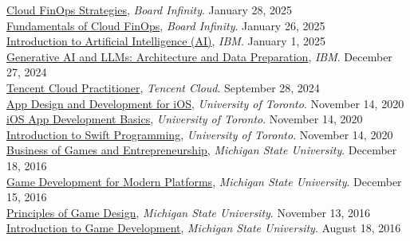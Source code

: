 \documentclass[10pt]{res} %
\begin{document}
\begin{resume}
\colorbox{coursera}{}

\href{https://www.coursera.org/account/accomplishments/verify/W17OMEODYOGQ}{\color{blue}Cloud FinOps Strategies}, {\sl Board Infinity}. \hfill January 28, 2025 \\
\href{https://www.coursera.org/account/accomplishments/verify/2QHS7KJOMACG}{\color{blue}Fundamentals of Cloud FinOps}, {\sl Board Infinity}. \hfill January 26, 2025 \\
\href{https://www.coursera.org/account/accomplishments/verify/6F3Z3FC1R420}{\color{blue}Introduction to Artificial Intelligence (AI)}, {\sl IBM}. \hfill January 1, 2025 \\
\href{https://www.credly.com/badges/c5eb5d9d-c931-4ab3-af52-73b564aa8a4d}{\color{blue}Generative AI and LLMs: Architecture and Data Preparation}, {\sl IBM}. \hfill December 27, 2024 \\
\href{https://www.coursera.org/account/accomplishments/verify/M3NIYKKEW8LX}{\color{blue}Tencent Cloud Practitioner}, {\sl Tencent Cloud}. \hfill September 28, 2024 \\
\href{https://www.coursera.org/account/accomplishments/verify/6SB343K34JGV}{\color{blue}App Design and Development for iOS}, {\sl University of Toronto}. \hfill November 14, 2020 \\
\href{https://www.coursera.org/account/accomplishments/verify/8UX6MFTRHJZH}{\color{blue}iOS App Development Basics}, {\sl University of Toronto}. \hfill November 14, 2020 \\
\href{https://www.coursera.org/account/accomplishments/verify/28FWZ6P7JV9U}{\color{blue}Introduction to Swift Programming}, {\sl University of Toronto}. \hfill November 14, 2020 \\
\href{https://www.coursera.org/account/accomplishments/verify/6QKCPEQP4JS7}{\color{blue}Business of Games and Entrepreneurship}, {\sl Michigan State University}. \hfill December 18, 2016 \\
\href{https://www.coursera.org/account/accomplishments/verify/EPQCJG7AS8S7}{\color{blue}Game Development for Modern Platforms}, {\sl Michigan State University}. \hfill December 15, 2016 \\
\href{https://www.coursera.org/account/accomplishments/verify/Y5RTPP8G7B6A}{\color{blue}Principles of Game Design}, {\sl Michigan State University}. \hfill November 13, 2016 \\
\href{https://www.coursera.org/account/accomplishments/verify/2B2PYUWT8SLQ}{\color{blue}Introduction to Game Development}, {\sl Michigan State University}. \hfill August 18, 2016 \\

\end{resume}
\end{document}
